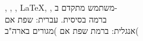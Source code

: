 \documentclass[english,hebrew,12pt,a4paper]{article}
\begin{document}
	{
	, 
	, 
	, 
	\LaTeX, 
	, 
	משתמש מתקדם ב-
	\\ ברמה בסיסית.
}
	{
	עברית: שפת אם
	\\
	אנגלית: ברמת שפת אם )מגורים בארה"ב(
	}	
\end{document}
